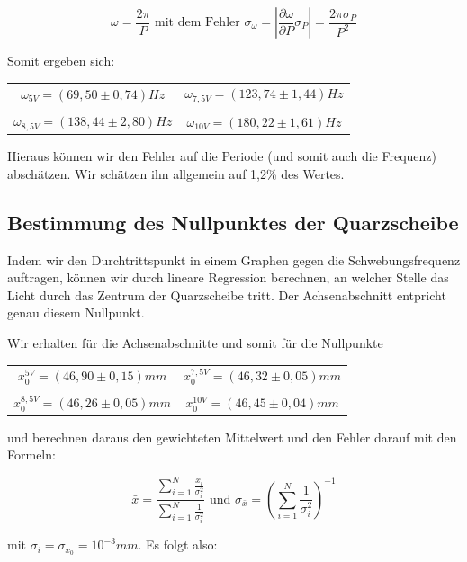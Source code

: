 $$\omega = \frac{2\pi}{P}   \text{ \ \ mit dem Fehler \ \ } 
\sigma_\omega = \left|\frac{\partial \omega}{\partial P}\sigma_P\right| = \frac{2\pi\sigma_P}{P^2}$$

Somit ergeben sich:

\begin{center}
\begin{tabular}[H]{c c}
$\omega_{5V} = (69,50 \pm 0,74) Hz$ & $\omega_{7,5V} = (123,74 \pm 1,44) Hz$\\
 & \\
$\omega_{8,5V} = (138,44 \pm 2,80) Hz$ & $\omega_{10V} = (180,22 \pm 1,61) Hz$
\end{tabular}
\end{center}

Hieraus können wir den Fehler auf die Periode (und somit auch die Frequenz) abschätzen. Wir schätzen ihn allgemein auf 1,2\% des Wertes.

\clearpage

\subsection{Bestimmung des Nullpunktes der Quarzscheibe}

Indem wir den Durchtrittspunkt in einem Graphen gegen die Schwebungsfrequenz auftragen, können wir durch lineare Regression berechnen, an welcher Stelle das Licht durch das Zentrum der Quarzscheibe tritt. Der Achsenabschnitt entpricht genau diesem Nullpunkt.

Wir erhalten für die Achsenabschnitte und somit für die Nullpunkte 

\begin{center}
\begin{tabular}[H]{c c}
$x_0^{5V} = (46,90 \pm 0,15) mm$ & $x_0^{7,5V} = (46,32 \pm 0,05) mm$\\
 & \\
$x_0^{8,5V} = (46,26 \pm 0,05) mm$ & $x_0^{10V}= (46,45 \pm 0,04) mm$
\end{tabular}
\end{center}


und berechnen daraus den gewichteten Mittelwert und den Fehler darauf mit den Formeln:

$$\bar x = \frac{\sum_{i=1}^{N} \frac{x_i}{\sigma_i^2}}{\sum_{i=1}^{N} \frac{1}{\sigma_i^2}} \text{ \ \ und \ \ } 
\sigma_{\bar x} = \left(\sum_{i=1}^{N} \frac{1}{\sigma_i^2}\right)^{-1} $$

mit $\sigma_i = \sigma_{x_0} = 10^{-3} mm$. Es folgt also: 

